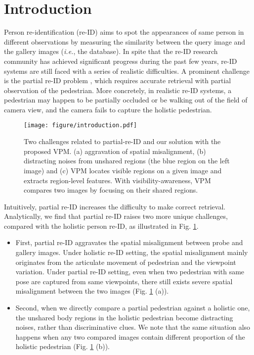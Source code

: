\documentclass[10pt,twocolumn,letterpaper]{article}
\begin{document}
\section{Introduction}
Person re-identification (re-ID) aims to spot the appearances of same person in different observations by measuring the similarity between the query image and the gallery images (\emph{i.e.}, the database). In spite that the re-ID research community has achieved significant progress during the past few years, re-ID systems are still faced with a series of realistic difficulties. A prominent challenge is the partial re-ID problem \cite {DBLP:conf/iccv/ZhengLXLLG15, HeLX2018Partial, DBLP:conf/cvpr/ZhengGX11},  which requires accurate retrieval with partial observation of the pedestrian. More concretely, in realistic re-ID systems, a pedestrian may happen to be partially occluded or be walking out of the field of camera view, and the camera fails to capture the holistic pedestrian. 

\begin{figure}[t]
\setlength{\abovecaptionskip}{-1.2cm} 
\setlength{\belowcaptionskip}{-0.4cm}
\begin{center}
\texttt{[image: figure/introduction.pdf]}
\end{center}
   \caption{Two challenges related to partial-re-ID and our solution with the proposed VPM. (a) aggravation of spatial misalignment, (b) distracting noises from unshared regions (the blue region on the left image) and (c) VPM locates visible regions on a given image and extracts region-level features. With visibility-awareness, VPM compares two images by focusing on their shared regions.}
\label{fig:misalign}
\end{figure}


Intuitively, partial re-ID increases the difficulty to make correct retrieval. Analytically,  we find that partial re-ID raises two more unique challenges, compared with the holistic person re-ID, as illustrated in Fig. \ref{fig:misalign}. 
\begin {itemize}
\item First, partial re-ID aggravates the spatial misalignment between probe and gallery images. Under holistic re-ID setting, the spatial misalignment mainly originates from the articulate movement of pedestrian and the viewpoint variation. Under partial re-ID setting, even when two pedestrian with same pose are captured from same viewpoints, there still exists severe spatial misalignment between the two images (Fig. \ref{fig:misalign} (a)).
\item Second, when we directly compare a partial pedestrian against a holistic one, the unshared body regions in the holistic pedestrian become distracting noises, rather than discriminative clues. We note that the same situation also happens when any two compared images contain different proportion of the holistic pedestrian (Fig. \ref{fig:misalign} (b)). 
\end {itemize}
\end{document}
